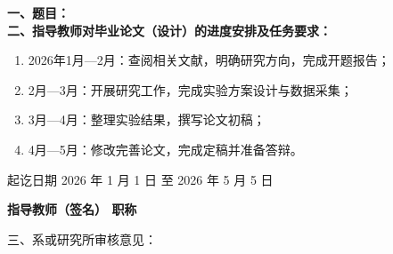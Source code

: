 \cleardoublepage{}

{
    \bfseries
    \noindent 一、题目：\\
    \noindent 二、指导教师对毕业论文（设计）的进度安排及任务要求：\\

    \begin{enumerate}
        \item 2026年1月—2月：查阅相关文献，明确研究方向，完成开题报告；
        \item 2月—3月：开展研究工作，完成实验方案设计与数据采集；
        \item 3月—4月：整理实验结果，撰写论文初稿；
        \item 4月—5月：修改完善论文，完成定稿并准备答辩。
    \end{enumerate}

    \noindent 起讫日期 2026 年 1 月 1 日 至 2026 年 5 月 5 日
    \begin{flushright}
        \bfseries {}
            指导教师（签名） \underline{} 职称 \underline{}
    \end{flushright}

    \noindent 三、系或研究所审核意见：\\

    \mbox{} \vfill
    \signature{负责人（签名）}
}
